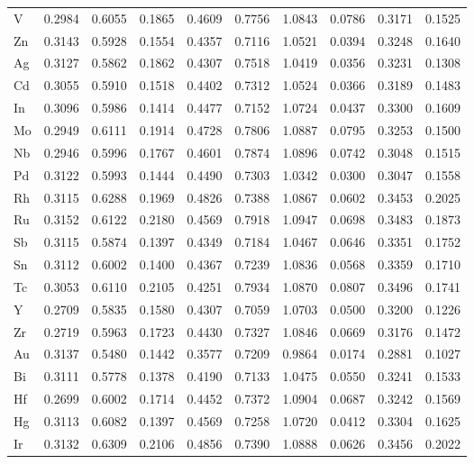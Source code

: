 \begin{table}[h]
{\begin{tabular}{*{10}{l}}
      V  & 0.2984 & 0.6055 & 0.1865 & 0.4609 & 0.7756 & 1.0843 & 0.0786 & 0.3171 & 0.1525 \\
      Zn & 0.3143 & 0.5928 & 0.1554 & 0.4357 & 0.7116 & 1.0521 & 0.0394 & 0.3248 & 0.1640 \\
      Ag & 0.3127 & 0.5862 & 0.1862 & 0.4307 & 0.7518 & 1.0419 & 0.0356 & 0.3231 & 0.1308 \\
      Cd & 0.3055 & 0.5910 & 0.1518 & 0.4402 & 0.7312 & 1.0524 & 0.0366 & 0.3189 & 0.1483 \\
      In & 0.3096 & 0.5986 & 0.1414 & 0.4477 & 0.7152 & 1.0724 & 0.0437 & 0.3300 & 0.1609 \\
      Mo & 0.2949 & 0.6111 & 0.1914 & 0.4728 & 0.7806 & 1.0887 & 0.0795 & 0.3253 & 0.1500 \\
      Nb & 0.2946 & 0.5996 & 0.1767 & 0.4601 & 0.7874 & 1.0896 & 0.0742 & 0.3048 & 0.1515 \\
      Pd & 0.3122 & 0.5993 & 0.1444 & 0.4490 & 0.7303 & 1.0342 & 0.0300 & 0.3047 & 0.1558 \\
      Rh & 0.3115 & 0.6288 & 0.1969 & 0.4826 & 0.7388 & 1.0867 & 0.0602 & 0.3453 & 0.2025 \\
      Ru & 0.3152 & 0.6122 & 0.2180 & 0.4569 & 0.7918 & 1.0947 & 0.0698 & 0.3483 & 0.1873 \\
      Sb & 0.3115 & 0.5874 & 0.1397 & 0.4349 & 0.7184 & 1.0467 & 0.0646 & 0.3351 & 0.1752 \\
      Sn & 0.3112 & 0.6002 & 0.1400 & 0.4367 & 0.7239 & 1.0836 & 0.0568 & 0.3359 & 0.1710 \\
      Tc & 0.3053 & 0.6110 & 0.2105 & 0.4251 & 0.7934 & 1.0870 & 0.0807 & 0.3496 & 0.1741 \\
      Y  & 0.2709 & 0.5835 & 0.1580 & 0.4307 & 0.7059 & 1.0703 & 0.0500 & 0.3200 & 0.1226 \\
      Zr & 0.2719 & 0.5963 & 0.1723 & 0.4430 & 0.7327 & 1.0846 & 0.0669 & 0.3176 & 0.1472 \\
      Au & 0.3137 & 0.5480 & 0.1442 & 0.3577 & 0.7209 & 0.9864 & 0.0174 & 0.2881 & 0.1027 \\
      Bi & 0.3111 & 0.5778 & 0.1378 & 0.4190 & 0.7133 & 1.0475 & 0.0550 & 0.3241 & 0.1533 \\
      Hf & 0.2699 & 0.6002 & 0.1714 & 0.4452 & 0.7372 & 1.0904 & 0.0687 & 0.3242 & 0.1569 \\
      Hg & 0.3113 & 0.6082 & 0.1397 & 0.4569 & 0.7258 & 1.0720 & 0.0412 & 0.3304 & 0.1625 \\
      Ir & 0.3132 & 0.6309 & 0.2106 & 0.4856 & 0.7390 & 1.0888 & 0.0626 & 0.3456 & 0.2022 \\

\end{tabular}}
\end{table}
